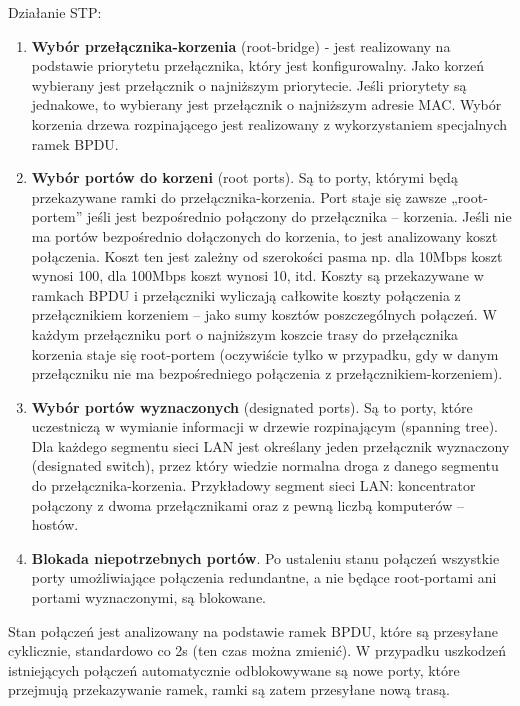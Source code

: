 \documentclass[main.tex]{subfiles}
\begin{document}
    \noindent Działanie STP:
    \begin{enumerate}
        \item \textbf{Wybór przełącznika-korzenia} (root-bridge) - jest realizowany na
        podstawie priorytetu przełącznika, który jest konfigurowalny. Jako korzeń wybierany
        jest przełącznik o najniższym priorytecie. Jeśli priorytety są jednakowe, to wybierany
        jest przełącznik o najniższym adresie MAC. Wybór korzenia drzewa rozpinającego jest
        realizowany z wykorzystaniem specjalnych ramek BPDU.
        \item \textbf{Wybór portów do korzeni} (root ports). Są to porty, którymi będą przekazywane ramki
        do przełącznika-korzenia. Port staje się zawsze „root-portem” jeśli jest bezpośrednio
        połączony do przełącznika – korzenia. Jeśli nie ma portów bezpośrednio dołączonych
        do korzenia, to jest analizowany koszt połączenia. Koszt ten jest zależny od szerokości
        pasma np. dla 10Mbps koszt wynosi 100, dla 100Mbps koszt
        wynosi 10, itd. Koszty są przekazywane w ramkach BPDU i
        przełączniki wyliczają całkowite koszty połączenia z przełącznikiem korzeniem – jako
        sumy kosztów poszczególnych połączeń. W każdym przełączniku port o najniższym
        koszcie trasy do przełącznika korzenia staje się root-portem (oczywiście tylko w
        przypadku, gdy w danym przełączniku nie ma bezpośredniego połączenia z
        przełącznikiem-korzeniem).
        \item \textbf{Wybór portów wyznaczonych} (designated ports). Są to porty, które uczestniczą
        w wymianie informacji w drzewie rozpinającym (spanning tree). Dla każdego
        segmentu sieci LAN jest określany jeden przełącznik wyznaczony (designated switch),
        przez który wiedzie normalna droga z danego segmentu do przełącznika-korzenia.
        Przykładowy segment sieci LAN: koncentrator połączony z dwoma przełącznikami
        oraz z pewną liczbą komputerów – hostów.
        \item \textbf{Blokada niepotrzebnych portów}. Po ustaleniu stanu połączeń wszystkie porty
        umożliwiające połączenia redundantne, a nie będące root-portami ani portami wyznaczonymi, są blokowane.
    \end{enumerate}

    Stan połączeń jest analizowany na podstawie ramek BPDU, które są przesyłane cyklicznie,
    standardowo co 2s (ten czas można zmienić). W przypadku uszkodzeń istniejących połączeń
    automatycznie odblokowywane są nowe porty, które przejmują przekazywanie ramek, ramki
    są zatem przesyłane nową trasą.
\end{document}
